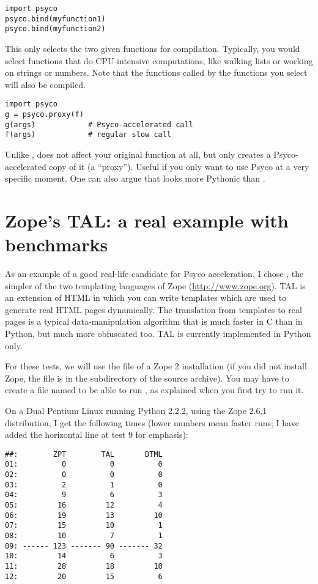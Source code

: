 \documentclass{manual}
\begin{document}
\begin{verbatim}
import psyco
psyco.bind(myfunction1)
psyco.bind(myfunction2)
\end{verbatim}

This only selects the two given functions for compilation. Typically, you would select functions that do CPU-intensive computations, like walking lists or working on strings or numbers.  Note that the functions called by the functions you select will also be compiled.

\begin{verbatim}
import psyco
g = psyco.proxy(f)
g(args)            # Psyco-accelerated call
f(args)            # regular slow call
\end{verbatim}

Unlike ,  does not affect your original function at all, but only creates a Psyco-accelerated copy of it (a ``proxy'').  Useful if you only want to use Psyco at a very specific moment.  One can also argue that  looks more Pythonic than .


\section{Zope's TAL: a real example with benchmarks}

As an example of a good real-life candidate for Psyco acceleration, I chose , the simpler of the two templating languages of Zope (\url{http://www.zope.org}).  TAL is an extension of HTML in which you can write templates which are used to generate real HTML pages dynamically.  The translation from templates to real pages is a typical data-manipulation algorithm that is much faster in C than in Python, but much more obfuscated too.  TAL is currently implemented in Python only.

For these tests, we will use the file  of a Zope 2 installation (if you did not install Zope, the file is in the  subdirectory of the source archive).  You may have to create a file named  to be able to run , as explained when you first try to run it.

On a Dual Pentium Linux running Python 2.2.2, using the Zope 2.6.1 distribution, I get the following times (lower numbers mean faster runs; I have added the horizontal line at test 9 for emphasis):

\begin{verbatim}
##:        ZPT        TAL       DTML
01:          0          0          0
02:          0          0          0
03:          2          1          0
04:          9          6          3
05:         16         12          4
06:         19         13         10
07:         15         10          1
08:         10          7          1
09: ------ 123 ------- 90 ------- 32
10:         14          6          3
11:         28         18         10
12:         20         15          6
\end{verbatim}
\end{document}
